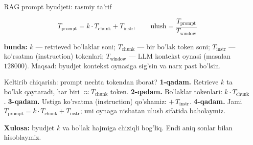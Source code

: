 \documentclass[aspectratio=169,11pt]{beamer}
\newcommand{\bunda}[1]{{\small\textbf{bunda:}\; #1}}
\begin{document}
\begin{frame}{RAG prompt byudjeti: rasmiy ta'rif}
  \begin{tcolorbox}[defbox,title={Ta'rif: prompt token hisobi}]
    \vspace{-0.4em}
    $$ T_{\text{prompt}} = k\cdot T_{\text{chunk}} + T_{\text{instr}}, \qquad
       \text{ulush} = \frac{T_{\text{prompt}}}{T_{\text{window}}} $$
  \end{tcolorbox}
  \vspace{2pt}
  \bunda{$k$ --- retrieved bo'laklar soni; $T_{\text{chunk}}$ --- bir bo'lak
  token soni; $T_{\text{instr}}$ --- ko'rsatma (instruction) tokenlari;
  $T_{\text{window}}$ --- LLM kontekst oynasi (masalan $128000$).}
  \vspace{4pt}
  \footnotesize Maqsad: byudjet kontekst oynasiga sig'sin va narx past bo'lsin.
\end{frame}

\begin{frame}{Keltirib chiqarish: prompt nechta tokendan iborat?}
  \textbf{1-qadam.} Retrieve $k$ ta bo'lak qaytaradi, har biri $\approx
  T_{\text{chunk}}$ token.
  \pause
  \textbf{2-qadam.} Bo'laklar tokenlari: $k\cdot T_{\text{chunk}}$.
  \pause
  \textbf{3-qadam.} Ustiga ko'rsatma (instruction) qo'shamiz:
  $+\,T_{\text{instr}}$.
  \pause
  \textbf{4-qadam.} Jami $T_{\text{prompt}} = k\cdot T_{\text{chunk}} +
  T_{\text{instr}}$; uni oynaga nisbatan ulush sifatida baholaymiz.
  \begin{tcolorbox}[okbox,top=2pt,bottom=2pt]
    \small \textbf{Xulosa:} byudjet $k$ va bo'lak hajmiga chiziqli bog'liq.
    Endi aniq sonlar bilan hisoblaymiz.
  \end{tcolorbox}
\end{frame}
\end{document}
